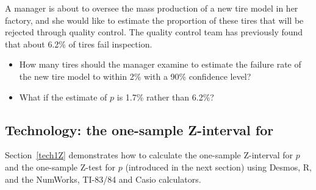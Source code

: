 \begin{exercisewrap}
\begin{nexercise}
A manager is about to oversee the mass production of a new tire model in her factory, and she would like to estimate the proportion of these tires that will be rejected through quality control. The quality control team has previously found that about 6.2\% of tires fail inspection.
\begin{itemize}
\setlength{\itemsep}{0mm}
\item[(a)] How many tires should the manager examine to estimate the failure rate of the new tire model to within 2\% with a 90\% confidence level?\footnotemark
\item[(b)] What if the estimate of $p$ is 1.7\% rather than 6.2\%?\footnotemark
 
\end{itemize}
\end{nexercise}
\end{exercisewrap}
\addtocounter{footnote}{-1}
\addtocounter{footnote}{1}




\subsection[Technology: the one-sample Z-interval for $p$]{Technology: the one-sample Z-interval for }

\noindent  Section~\ref{tech1Z} demonstrates how to calculate the one-sample Z-interval for $p$ and the one-sample Z-test for $p$ (introduced in the next section) using Desmos, R, and the NumWorks, TI-83/84 and Casio calculators. 


\D{\newpage}

